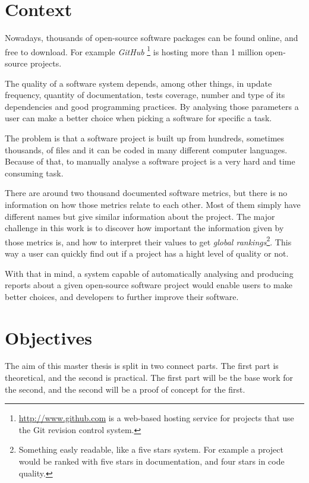 \documentclass[12pt]{article}
\begin{document}

\section{Context}
Nowadays, thousands of open-source software packages can be found online, and free to download. For example \textit{GitHub} \footnote{\url{http://www.github.com} is a web-based hosting service for projects that use the Git revision control system.} is hosting more than 1 million open-source projects.

The quality of a software system \cite{gousios2007software} depends, among other things, in update frequency, quantity of documentation, tests coverage, number and type of its dependencies and good programming practices. By analysing those parameters a user can make a better choice when picking a software for specific a task. \cite{marchenko2007predicting}

The problem is that a software project is built up from hundreds, sometimes thousands, of files and it can be coded in many different computer languages. Because of that, to manually analyse a software project is a very hard and time consuming task.

There are around two thousand documented software metrics, but there is no information on how those metrics relate to each other.\cite{kan2002metrics} Most of them simply have different names but give similar information about the project. The major challenge in this work is to discover how important the information given by those metrics is, and how to interpret their values to get \textit{global rankings}\footnote{Something easly readable, like a five stars system. For example a project would be ranked with five stars in documentation, and four stars in code quality. }. This way a user can quickly find out if a project has a hight level of quality or not.

With that in mind, a system capable of automatically analysing and producing reports \cite{hofer2010evaluating} about a given open-source software project would enable users to make better choices, and developers to further improve their software.


\section{Objectives}
The aim of this master thesis is split in two connect parts. The first part is theoretical, and the second is practical. The first part will be the base work for the second, and the second will be a proof of concept for the first.
\end{document}
